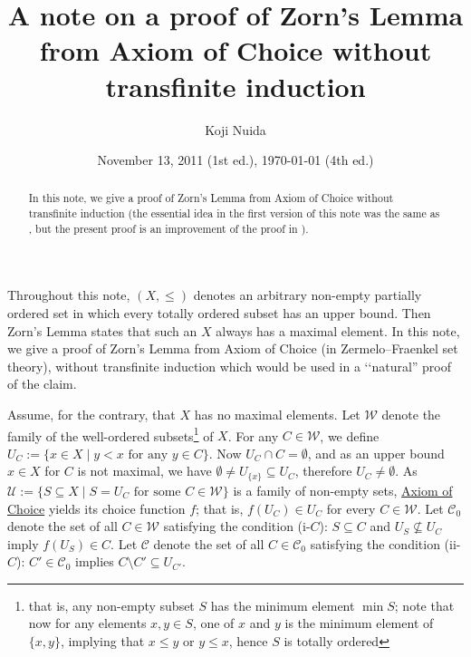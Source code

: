 \documentclass{article}
\title{A note on a proof of Zorn's Lemma from Axiom of Choice without transfinite induction}
\author{Koji Nuida}
\date{November 13, 2011 (1st ed.), \today{} (4th ed.)}
\begin{document}
\maketitle

\begin{abstract}
In this note, we give a proof of Zorn's Lemma from Axiom of Choice without transfinite induction (the essential idea in the first version of this note was the same as \cite[Theorem 4.19]{RubRub85}, but the present proof is an improvement of the proof in \cite{Lewin91}).
\end{abstract}

Throughout this note, $(X,\leq)$ denotes an arbitrary non-empty partially ordered set in which every totally ordered subset has an upper bound.
Then Zorn's Lemma states that such an $X$ always has a maximal element.
In this note, we give a proof of Zorn's Lemma from Axiom of Choice (in Zermelo--Fraenkel set theory), without transfinite induction which would be used in a \lq\lq natural'' proof of the claim.

Assume, for the contrary, that $X$ has no maximal elements.
Let $\mathcal{W}$ denote the family of the well-ordered subsets\footnote{that is, any non-empty subset $S$ has the minimum element $\min S$; note that now for any elements $x,y \in S$, one of $x$ and $y$ is the minimum element of $\{x,y\}$, implying that $x \leq y$ or $y \leq x$, hence $S$ is totally ordered} of $X$.
For any $C \in \mathcal{W}$, we define $U_C := \{ x \in X \mid y < x \mbox{ for any } y \in C \}$.
Now $U_C \cap C = \emptyset$, and as an upper bound $x \in X$ for $C$ is not maximal, we have $\emptyset \neq U_{\{x\}} \subseteq U_C$, therefore $U_C \neq \emptyset$.
As $\mathcal{U} := \{ S \subseteq X \mid S = U_C \mbox{ for some } C \in \mathcal{W} \}$ is a family of non-empty sets, \underline{Axiom of Choice} yields its choice function $f$; that is, $f(U_C) \in U_C$ for every $C \in \mathcal{W}$.
Let $\mathcal{C}_0$ denote the set of all $C \in \mathcal{W}$ satisfying the condition (i-$C$): $S \subseteq C$ and $U_S \not\subseteq U_C$ imply $f(U_S) \in C$.
Let $\mathcal{C}$ denote the set of all $C \in \mathcal{C}_0$ satisfying the condition (ii-$C$): $C' \in \mathcal{C}_0$ implies $C \setminus C' \subseteq U_{C'}$.
\end{document}
